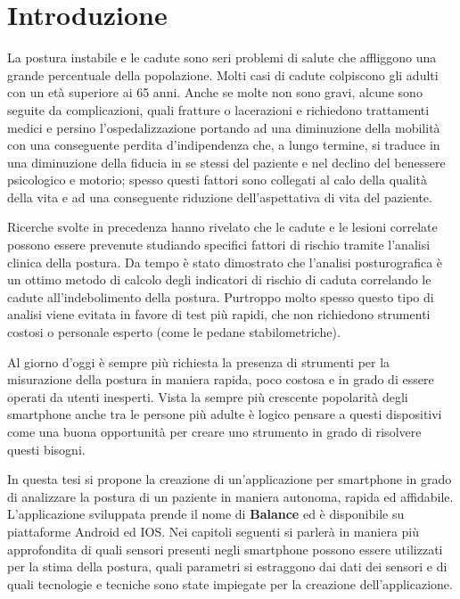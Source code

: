 \chapter{Introduzione}
\label{cap:introduzione}
La postura instabile e le cadute sono seri problemi di salute che affliggono una grande percentuale della popolazione\cite{rubenstein}. Molti casi di cadute colpiscono gli adulti con un età superiore ai 65 anni. Anche se molte non sono gravi, alcune sono seguite da complicazioni, quali fratture o lacerazioni e richiedono trattamenti medici e persino l'ospedalizzazione portando ad una diminuzione della mobilità con una conseguente perdita d'indipendenza che, a lungo termine, si traduce in una diminuzione della fiducia in se stessi del paziente e nel declino del benessere psicologico e motorio; spesso questi fattori sono collegati al calo della qualità della vita e ad una conseguente riduzione dell'aspettativa di vita del paziente\cite{krupitzer}.

Ricerche svolte in precedenza hanno rivelato che le cadute e le lesioni correlate possono essere prevenute studiando specifici fattori di rischio tramite l'analisi clinica della postura\cite{gillespie}. Da tempo è stato dimostrato che l'analisi posturografica è un ottimo metodo di calcolo degli indicatori di rischio di caduta correlando le cadute all'indebolimento della postura. Purtroppo molto spesso questo tipo di analisi viene evitata in favore di test più rapidi, che non richiedono strumenti costosi o personale esperto (come le pedane stabilometriche)\cite{mancini}.

Al giorno d'oggi è sempre più richiesta la presenza di strumenti per la misurazione della postura in maniera rapida, poco costosa e in grado di essere operati da utenti inesperti. Vista la sempre più crescente popolarità degli smartphone anche tra le persone più adulte è logico pensare a questi dispositivi come una buona opportunità per creare uno strumento in grado di risolvere questi bisogni\cite{roeing}. 

In questa tesi si propone la creazione di un'applicazione per smartphone in grado di analizzare la postura di un paziente in maniera autonoma, rapida ed affidabile. L'applicazione sviluppata prende il nome di {\bfseries Balance} ed è disponibile su piattaforme Android ed IOS. Nei capitoli seguenti si parlerà in maniera più approfondita di quali sensori presenti negli smartphone possono essere utilizzati per la stima della postura, quali parametri si estraggono dai dati dei sensori e di quali tecnologie e tecniche sono state impiegate per la creazione dell'applicazione.